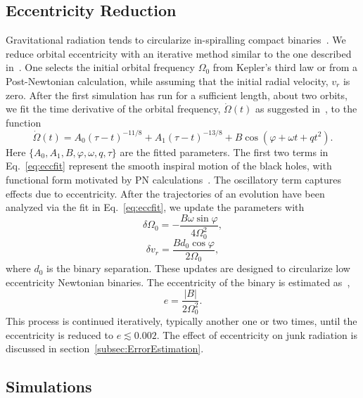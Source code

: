 \subsection{Eccentricity Reduction}
Gravitational radiation tends to circularize in-spiralling compact
binaries~\citep{PetersMathews1963,Peters1964}. We reduce orbital
eccentricity with an iterative method similar to the one described in~\citep{Boyle2007,Chu2009}. One selects the initial orbital
frequency $\Omega_0$ from Kepler's third law or from a Post-Newtonian
calculation, while assuming that the initial radial velocity, $v_r$ is
zero. After the first simulation has run for a sufficient length, about two orbits, we fit the time derivative of
the orbital frequency, $\dot{\Omega}(t)$ as suggested
in~\cite{Buonanno:2010yk}, to the function
\begin{equation}
\label{eq:eccfit}
\dot{\Omega}(t)=A_0\left(\tau-t\right)^{-11/8}+A_1\left(\tau-t\right)^{-13/8}
+B\cos\left(\varphi + \omega
  t+qt^2\right).
\end{equation}
Here $\{A_0,A_1,B,\varphi,\omega,q,\tau\}$ are the fitted parameters. The first two terms in Eq.~\ref{eq:eccfit} represent the
smooth inspiral motion of the black holes, with functional form motivated by PN calculations~\citep{Blanchet:2009rw}. The oscillatory term captures effects due to eccentricity. After the trajectories of an evolution have been analyzed via the fit in Eq.~\ref{eq:eccfit}, we update the parameters with
\begin{equation}
\delta\Omega_0=-\frac{B\omega\sin{\varphi}}{4\Omega_0^2},
\end{equation}
\begin{equation}
\delta v_r = \frac{B d_0\cos{\varphi}}{2\Omega_0},
\end{equation}
where $d_0$ is the binary separation. These updates are designed to circularize low eccentricity Newtonian binaries. The eccentricity of the binary is estimated as~\citep{Buonanno:2010yk},
\begin{equation}
e = \frac{|B|}{2\Omega_0^2}.
\end{equation}
 This
process is continued iteratively, typically another one or two times,
until the eccentricity is reduced to $e\lesssim 0.002$. The effect of
eccentricity on junk radiation is discussed in section~\ref{subsec:ErrorEstimation}.

\subsection{Simulations}

